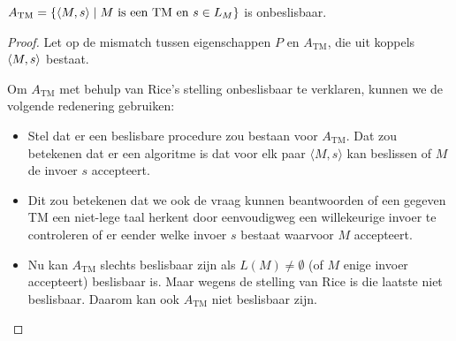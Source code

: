 \documentclass[../aanvullingen_cursus.tex]{subfiles}
\begin{document}
\begin{stelling}
	\( A_\text{TM} = \{ \langle M,s \rangle \mid M \text{ is een TM en }s\in L_M \} \) is onbeslisbaar.
\end{stelling}


\begin{proof}
	Let op de mismatch tussen eigenschappen \(P\) en \(A_\text{TM}\), die uit koppels \(\langle M,s \rangle\) bestaat.

	Om \( A_{\text{TM}} \) met behulp van Rice’s stelling onbeslisbaar te verklaren, kunnen we de volgende redenering gebruiken:

	\begin{itemize}
		\item Stel dat er een beslisbare procedure zou bestaan voor \( A_{\text{TM}} \). Dat zou betekenen dat er een algoritme is dat voor elk paar \( \langle M, s \rangle \) kan beslissen of \( M \) de invoer \( s \) accepteert.
		\item 	Dit zou betekenen dat we ook de vraag kunnen beantwoorden of een gegeven TM een niet-lege taal herkent door eenvoudigweg een willekeurige invoer te controleren of er eender welke invoer \( s \) bestaat waarvoor \( M \) accepteert.
		\item Nu kan \( A_{\text{TM}} \) slechts beslisbaar zijn als \( L(M) \neq \emptyset\) (of \( M \) enige invoer accepteert) beslisbaar is. Maar wegens de stelling van Rice is die laatste niet beslisbaar. Daarom kan ook \( A_{\text{TM}} \) niet beslisbaar zijn.
	\end{itemize}


\end{proof}
\end{document}
